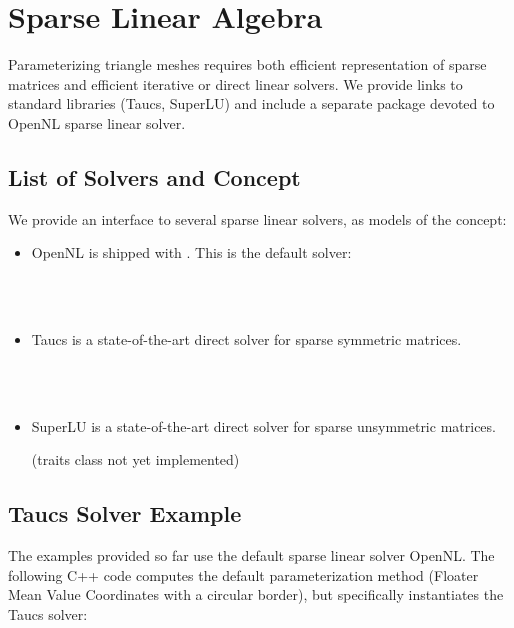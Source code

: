 \section{Sparse Linear Algebra}

Parameterizing triangle meshes requires both efficient representation
of sparse matrices and efficient iterative or direct linear
solvers. We provide links to standard libraries ({\sc Taucs}, SuperLU)
and include a separate package devoted to OpenNL sparse linear solver.

\subsection{List of Solvers and Concept}

We provide an interface to several sparse linear solvers, as models
of the  concept:

\begin{itemize}

\item OpenNL \cite{cgal:l-nmdgp-05} is shipped with \cgal. This is the default solver:

  \\
  \\

\item {\sc Taucs} is a state-of-the-art direct solver for sparse symmetric matrices.

  \\
  \\

\item SuperLU is a state-of-the-art direct solver for sparse unsymmetric matrices.

(traits class not yet implemented)

\end{itemize}


\subsection{{\sc Taucs} Solver Example}

The examples provided so far use the default sparse linear solver
OpenNL. The following C++ code computes the default parameterization
method (Floater Mean Value Coordinates with a circular border), but
specifically instantiates the {\sc Taucs} solver:

